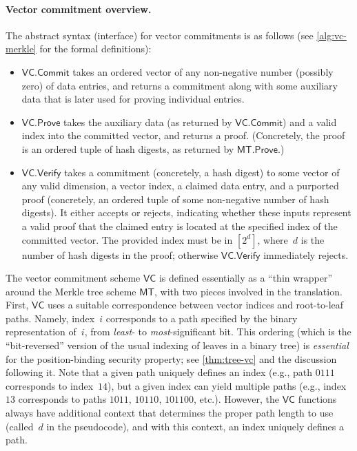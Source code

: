 \documentclass[11pt,hidelinks]{article}
\newcommand{\algo}[1]{\ensuremath{\mathsf{#1}}}
\newcommand{\MT}{\algo{MT}}
\newcommand{\VC}{\algo{VC}}
\newcommand{\Commit}{\algo{Commit}}
\newcommand{\Prove}{\algo{Prove}}
\newcommand{\Verify}{\algo{Verify}}
\begin{document}
\paragraph{Vector commitment overview.}

The abstract syntax (interface) for vector commitments is as follows
(see \cref{alg:vc-merkle} for the formal definitions):
\begin{itemize}
\item $\VC.\Commit$ takes an ordered vector of any non-negative number
  (possibly zero) of data entries, and returns a commitment along with
  some auxiliary data that is later used for proving individual
  entries.
  
\item $\VC.\Prove$ takes the auxiliary data (as returned by
  $\VC.\Commit$) and a valid index into the committed vector, and
  returns a proof.  (Concretely, the proof is an ordered tuple of hash
  digests, as returned by $\MT.\Prove$.)
  
\item $\VC.\Verify$ takes a commitment (concretely, a hash digest) to
  some vector of any valid dimension, a vector index, a claimed data
  entry, and a purported proof (concretely, an ordered tuple of some
  non-negative number of hash digests). It either accepts or rejects,
  indicating whether these inputs represent a valid proof that the
  claimed entry is located at the specified index of the committed
  vector. The provided index must be in $[2^{d}]$, where~$d$ is the
  number of hash digests in the proof; otherwise $\VC.\Verify$
  immediately rejects.
\end{itemize}

The vector commitment scheme $\VC$ is defined essentially as a ``thin
wrapper'' around the Merkle tree scheme $\MT$, with two pieces
involved in the translation. First, $\VC$ uses a suitable
correspondence between vector indices and root-to-leaf paths. Namely,
index~$i$ corresponds to a path specified by the binary representation
of~$i$, from \emph{least}- to \emph{most}-significant bit. This
ordering (which is the ``bit-reversed'' version of the usual indexing
of leaves in a binary tree) is \emph{essential} for the
position-binding security property; see \cref{thm:tree-vc} and the
discussion following it. Note that a given path uniquely defines an
index (e.g., path $0111$ corresponds to index~$14$), but a given index
can yield multiple paths (e.g., index~$13$ corresponds to paths
$1011$, $10110$, $101100$, etc.). However, the $\VC$ functions always
have additional context that determines the proper path length to use
(called~$d$ in the pseudocode), and with this context, an index
uniquely defines a path.
\end{document}
